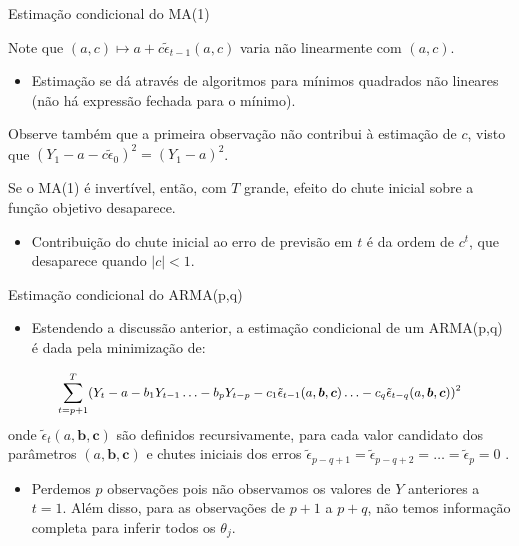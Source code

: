 \documentclass[11pt]{beamer}
\newenvironment{halfwideitemize}{\itemize\addtolength{\itemsep}{0.5em}}{\enditemize}
\begin{document}
\begin{frame}{Estimação condicional do MA(1)}
	\begin{halfwideitemize}
\item Note que $(a,c)\mapsto a + c\tilde{\epsilon}_{t-1}(a,c)$ varia não linearmente com $(a,c)$.
\begin{itemize}
	\item Estimação se dá através de algoritmos para mínimos quadrados não lineares (não há  expressão fechada para o mínimo).
\end{itemize}
\item Observe também que a primeira observação não contribui à estimação de $c$, visto que $(Y_1 - a - c\tilde{\epsilon}_0)^2 = (Y_1 - a)^2$.
\item Se o MA(1) é {\color{blue}invertível}, então, com $T$ grande, efeito do chute inicial sobre a função objetivo desaparece.
\begin{itemize}
	\item Contribuição do chute inicial ao erro de previsão em $t$ é da ordem de $c^t$, que desaparece quando $|c| < 1$. 
\end{itemize}
	\end{halfwideitemize}
\end{frame}

\begin{frame}{Estimação condicional do ARMA(p,q)}
	\begin{itemize}
		\item Estendendo a discussão anterior, a estimação condicional de um ARMA(p,q) é dada pela minimização de:
\end{itemize}
		\begin{equation*}
			\small  \sum_{t= p+1}^{T}(Y_t -a -  b_1 Y_{t-1}  \ldots - b_p Y_{t-p} -  c_1\tilde{\epsilon}_{t-1}(a,\boldsymbol{b},\boldsymbol{c}) \ldots -c_q \tilde{\epsilon}_{t-q}(a,\boldsymbol{b},\boldsymbol{c})  )^2
\end{equation*}
onde $\tilde{\epsilon}_t(a,\boldsymbol{b},\boldsymbol{c})$ são definidos recursivamente, para cada valor candidato dos parâmetros $(a,\boldsymbol{b},\boldsymbol{c})$ e chutes iniciais dos erros $\tilde{\epsilon}_{p-q+1} = \tilde{\epsilon}_{p-q+2} = \ldots = \tilde{\epsilon}_{p} =0$ .
\begin{itemize}
	\item Perdemos $p$ observações pois não observamos os valores de $Y$ anteriores a $t=1$. Além disso, para as observações de $p+1$ a $p+q$, não temos informação completa para inferir todos os $\theta_j$.
\end{itemize}
\end{frame}
\end{document}
